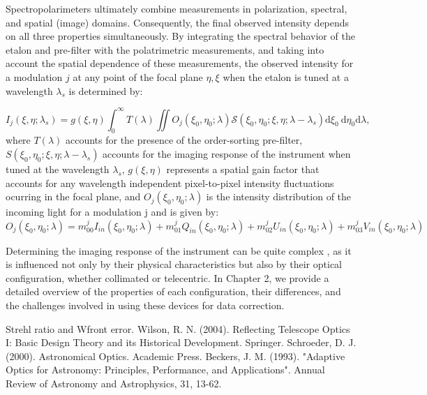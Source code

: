 Spectropolarimeters ultimately combine measurements in polarization, spectral, and spatial (image) domains. Consequently, the final observed intensity depends on all three properties simultaneously. By integrating the spectral behavior of the etalon and pre-filter with the polatrimetric measurements, and taking into account the spatial dependence of these measurements, the observed intensity for a modulation $j$ at any point of the focal plane $\eta, \xi$ when the etalon is tuned at a wavelength $\lambda _ s$ is determined by:

\begin{equation}
  I_ j\left(\xi, \eta ; \lambda_{s}\right)=g(\xi, \eta)\int_{0}^{\infty} T(\lambda) \iint  O _ j\left(\xi_0, \eta_0 ; \lambda\right)  \mathcal{S}\left(\xi_0, \eta_0; \xi , \eta; \lambda-\lambda_{s}\right)  \mathrm{d} \xi_{0} \mathrm{~d} \eta_{0}\mathrm{d} \lambda ,
  \label{eq_spectro: General_Intensity}
\end{equation}
where $T(\lambda)$ accounts for the presence of the order-sorting pre-filter, $S\left(\xi_0, \eta_0; \xi , \eta; \lambda-\lambda_{s}\right)$ accounts for the imaging response of the instrument when tuned at the wavelength $\lambda_{s}$, $g(\xi, \eta)$ represents a spatial gain factor that accounts for any wavelength independent pixel-to-pixel intensity fluctuations ocurring in the focal plane, and $O _ j(\xi_0, \eta_ 0;\lambda)$ is the intensity distribution of the incoming light for a modulation j and is given by:
\begin{equation}
  O _ j(\xi_0, \eta_ 0;\lambda) = m_{00} ^jI_{in}(\xi_0, \eta_ 0;\lambda) + m_{01}^jQ_{in}(\xi_0, \eta_ 0;\lambda) + m_{02}^jU_{in}(\xi_0, \eta_ 0;\lambda) + m_{03}^jV_{in}(\xi_0, \eta_ 0;\lambda)
\end{equation}

Determining the imaging response of the instrument can be quite complex , as it is influenced not only by their physical characteristics but also by their optical configuration, whether collimated or telecentric. In Chapter 2, we provide a detailed overview of the properties of each configuration, their differences, and the challenges involved in using these devices for data correction.

Strehl ratio and Wfront error. 
Wilson, R. N. (2004). Reflecting Telescope Optics I: Basic Design Theory and its Historical Development. Springer.
Schroeder, D. J. (2000). Astronomical Optics. Academic Press.
Beckers, J. M. (1993). "Adaptive Optics for Astronomy: Principles, Performance, and Applications". Annual Review of Astronomy and Astrophysics, 31, 13-62.

